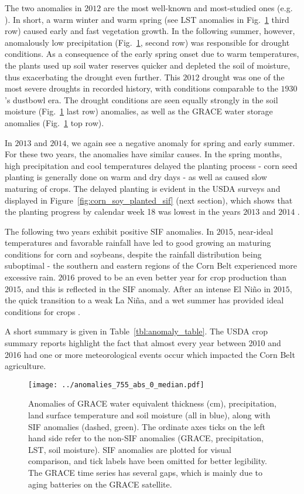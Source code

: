 \documentclass[preprint, a4paper, 10pt, times, 5p]{elsarticle}
\begin{document}
The two anomalies in $2012$ are the most well-known and most-studied ones (e.g. \citet{wolf2016warm}). In short, a warm winter and warm spring (see LST anomalies in Fig.~\ref{fig:anomalies_0} third row) caused early and fast vegetation growth. In the following summer, however, anomalously low precipitation (Fig.~\ref{fig:anomalies_0}, second row) was responsible for drought conditions. As a consequence of the early spring onset due to warm temperatures, the plants used up soil water reserves quicker and depleted the soil of moisture, thus exacerbating the drought even further. This $2012$ drought was one of the most severe droughts in recorded history, with conditions comparable to the $1930$'s dustbowl era. The drought conditions are seen equally strongly in the soil moisture (Fig.~\ref{fig:anomalies_0} last row) anomalies, as well as the GRACE water storage anomalies (Fig.~\ref{fig:anomalies_0} top row). 

In $2013$ and $2014$, we again see a negative anomaly for spring and early summer. For these two years, the anomalies have similar causes. In the spring months, high precipitation and cool temperatures delayed the planting process - corn seed planting is generally done on warm and dry days \citep{kucharik2008contribution,choi2017climatic} - as well as caused slow maturing of crops. The delayed planting is evident in the USDA surveys and displayed in Figure~\ref{fig:corn_soy_planted_sif} (next section), which shows that the planting progress by calendar week 18 was lowest in the years $2013$ and $2014$ \citep{USDA2013,USDA2014}. 

The following two years exhibit positive SIF anomalies. In $2015$, near-ideal temperatures and favorable rainfall have led to good growing an maturing conditions for corn and soybeans, despite the rainfall distribution being suboptimal - the southern and eastern regions of the Corn Belt experienced more excessive rain. $2016$ proved to be an even better year for crop production than $2015$, and this is reflected in the SIF anomaly. After an intense El Ni\~no in $2015$, the quick transition to a weak La Ni\~na, and a wet summer has provided ideal conditions for crops \citep{USDA2015,USDA2016}.

A short summary is given in Table~\ref{tbl:anomaly_table}. The USDA crop summary reports highlight the fact that almost every year between 2010 and 2016 had one or more meteorological events occur which impacted the Corn Belt agriculture. 

\begin{figure}[htbp]
\centering
\texttt{[image: ../anomalies\_755\_abs\_0\_median.pdf]}
\caption{Anomalies of GRACE water equivalent thickness (cm), precipitation, land surface temperature and soil moisture (all in blue), along with SIF anomalies (dashed, green). The ordinate axes ticks on the left hand side refer to the non-SIF anomalies (GRACE, precipitation, LST, soil moisture). SIF anomalies are plotted for visual comparison, and tick labels have been omitted for better legibility. The GRACE time series has several gaps, which is mainly due to aging batteries on the GRACE satellite.}
\label{fig:anomalies_0}
\end{figure}
\end{document}
